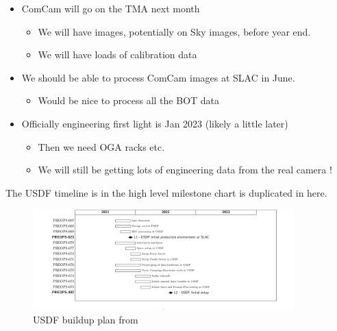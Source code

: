 \begin{itemize}

\item ComCam will go on the TMA next month

  \begin{itemize}

  \item We will have images, potentially on Sky images, before year end.

  \item We will have loads of calibration data

  \end{itemize}
  
\item We should be able to process ComCam images at SLAC in June.

  \begin{itemize}

  \item Would be nice to process all the BOT data

  \end{itemize}

\item Officially engineering first light is Jan 2023 (likely a little later)

  \begin{itemize}

  \item Then we need OGA racks etc.

  \item We will still be getting lots of engineering data from the real camera !

  \end{itemize}

\end{itemize}

The USDF timeline is in  the high level milestone chart is duplicated in  here.

\begin{figure}
\begin{centering}
\includegraphics[width=0.9\textwidth]{USDFplan}
	\caption{USDF buildup plan from \label{fig:usdfplan}}
\end{centering}
\end{figure}

